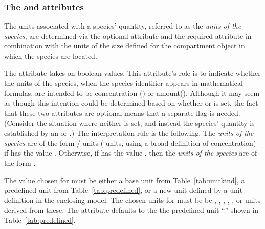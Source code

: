 \subsubsection{The  and
     attributes}
\label{sec:species-units}

The units associated with a species' quantity, referred to as the
\emph{units of the species}, are determined via the optional
attribute  and the required attribute 
 in combination with the units of the
size defined for the compartment object in which the species are
located.

The attribute  takes on boolean
values.  This attribute's role is to
indicate whether the units of the species, when the species
identifier appears in mathematical formulas, are intended to be
concentration () or amount().  Although it may seem as though this
intention could be determined based on whether
 or  is set, the
fact that these two attributes are optional means that a separate
flag is needed.  (Consider the situation where neither is set, and
instead the species' quantity is established by an
\InitialAssignment or \AssignmentRule.)  The interpretation rule
is the following.  The \emph{units of the species} are of the form
/ units (\ie
{} units, using a broad definition of
concentration) if  has the value
.  Otherwise, if  has the
value , then the \emph{units of the species} are of the
form .

The value chosen for  must be
either a base unit from Table~\vref{tab:unitkind}, a predefined unit
from Table~\vref{tab:predefined}, or a new unit defined by a unit
definition in the enclosing model.  The chosen units for
 must be be ,
, , , , or
units derived from these.  The 
attribute defaults to the the predefined unit
``'' shown in Table~\vref{tab:predefined}.

%

